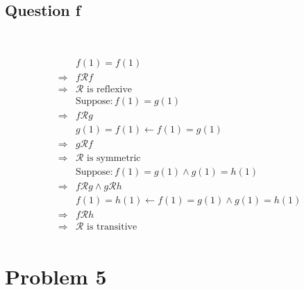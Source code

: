 \documentclass{article}
\begin{document}
\subsection*{Question f}

~

\begin{equation*}
    \begin{split}
        &f(1)=f(1)\\
        \Rightarrow&f\mathcal{R} f\\
        \Rightarrow&\mathcal{R}\text{ is reflexive}\\
        &\text{Suppose}:f(1)=g(1)\\
        \Rightarrow&f\mathcal{R}g\\
        &g(1)=f(1)\leftarrow f(1)=g(1)\\
        \Rightarrow&g\mathcal{R}f\\
        \Rightarrow&\mathcal{R}\text{ is symmetric}\\
        &\text{Suppose}:f(1)=g(1)\land g(1)=h(1)\\
        \Rightarrow&f\mathcal{R}g\land g\mathcal{R}h\\
        &f(1)=h(1)\leftarrow f(1)=g(1)\land g(1)=h(1)\\
        \Rightarrow &f\mathcal{R}h\\
        \Rightarrow&\mathcal{R}\text{ is transitive}\\
    \end{split}
\end{equation*}

\newpage

\section*{Problem 5}

~
\end{document}
